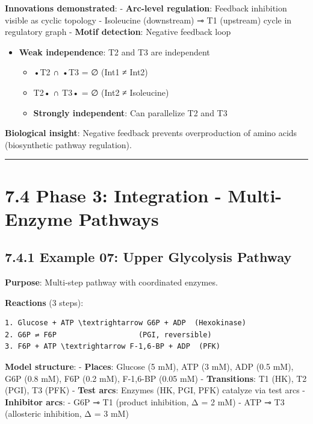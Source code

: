 \textbf{Innovations demonstrated}: - \checkmark \textbf{Arc-level regulation}:
Feedback inhibition visible as cyclic topology - Isoleucine (downstream)
⊸ T1 (upstream) \textrightarrow cycle in regulatory graph - \textbf{Motif detection}:
Negative feedback loop

\begin{itemize}
\tightlist
\item
  \checkmark \textbf{Weak independence}: T2 and T3 are independent

  \begin{itemize}
  \tightlist
  \item
    •T2 ∩ •T3 = ∅ (Int1 ≠ Int2)
  \item
    T2• ∩ T3• = ∅ (Int2 ≠ Isoleucine)
  \item
    \textbf{Strongly independent}: Can parallelize T2 and T3
  \end{itemize}
\end{itemize}

\textbf{Biological insight}: Negative feedback prevents overproduction
of amino acids (biosynthetic pathway regulation).

\begin{center}\rule{0.5\linewidth}{0.5pt}\end{center}

\hypertarget{phase-3-integration---multi-enzyme-pathways}{%
\section{7.4 Phase 3: Integration - Multi-Enzyme
Pathways}\label{phase-3-integration---multi-enzyme-pathways}}

\hypertarget{example-07-upper-glycolysis-pathway}{%
\subsection{7.4.1 Example 07: Upper Glycolysis
Pathway}\label{example-07-upper-glycolysis-pathway}}

\textbf{Purpose}: Multi-step pathway with coordinated enzymes.

\textbf{Reactions} (3 steps):

\begin{lstlisting}
1. Glucose + ATP \textrightarrow G6P + ADP  (Hexokinase)
2. G6P ⇌ F6P                   (PGI, reversible)
3. F6P + ATP \textrightarrow F-1,6-BP + ADP  (PFK)
\end{lstlisting}

\textbf{Model structure}: - \textbf{Places}: Glucose (5 mM), ATP (3 mM),
ADP (0.5 mM), G6P (0.8 mM), F6P (0.2 mM), F-1,6-BP (0.05 mM) -
\textbf{Transitions}: T1 (HK), T2 (PGI), T3 (PFK) - \textbf{Test arcs}:
Enzymes (HK, PGI, PFK) catalyze via test arcs - \textbf{Inhibitor arcs}:
- G6P ⊸ T1 (product inhibition, Δ = 2 mM) - ATP ⊸ T3 (allosteric
inhibition, Δ = 3 mM)

